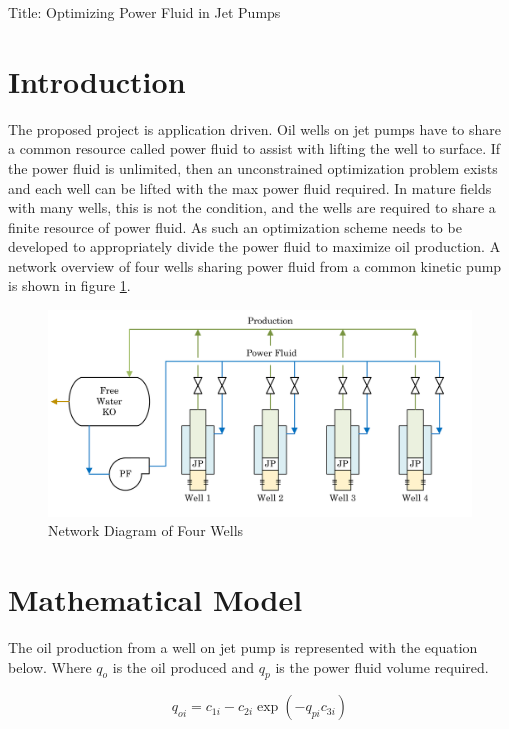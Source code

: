 \documentclass{article}
\begin{document}
\begin{center}
    \Large Title: Optimizing Power Fluid in Jet Pumps \par
\end{center}

\section{Introduction}

The proposed project is application driven. Oil wells on jet pumps have to share a common resource called power fluid to assist with lifting the well to surface. If the power fluid is unlimited, then an unconstrained optimization problem exists and each well can be lifted with the max power fluid required. In mature fields with many wells, this is not the condition, and the wells are required to share a finite resource of power fluid. As such an optimization scheme needs to be developed to appropriately divide the power fluid to maximize oil production. A network overview of four wells sharing power fluid from a common kinetic pump is shown in figure \ref{fig:jetpump_network}.

\begin{figure}[H]
    \centering
    \includegraphics[width=1\linewidth]{figures/network_diagram.PNG}
    \caption{Network Diagram of Four Wells}
    \label{fig:jetpump_network}
\end{figure}

\section{Mathematical Model}

The oil production from a well on jet pump is represented with the equation below. Where $q_{o}$ is the oil produced and $q_{p}$ is the power fluid volume required.

\begin{equation*}
    q_{oi} = c_{1i} - c_{2i} \exp{(-q_{pi} c_{3i})}
\end{equation*}
\end{document}

